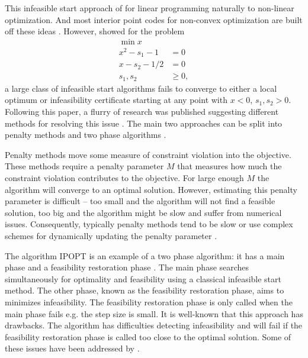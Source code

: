 \documentclass{article}
\begin{document}
This infeasible start approach of \cite{lustig1990feasibility} for linear programming naturally to non-linear optimization. 
And most interior point codes for non-convex optimization are built off these ideas \cite{vanderbei1999loqo,wachter2006implementation,byrd2006knitro}. However, \cite{wachter2000failure} showed for the problem
\begin{subequations}\label{failure-ex}
\begin{flalign}
\min { x }\\
x^2 - s_1 - 1 &= 0 \\
x - s_2 - 1/2 &= 0 \\
s_1, s_2 &\ge 0,
\end{flalign}
\end{subequations}
a large class of infeasible start algorithms fails to converge to either a local optimum or infeasibility certificate starting at any point with $x < 0$, $s_{1}, s_{2} > 0$. Following this paper, a flurry of research was published suggesting different methods for resolving this issue \cite{benson2004interior}. The main two approaches can be split into penalty methods \cite{liu2004robust, chen2006interior,curtis2012penalty,gould2015interior} and two phase algorithms \cite{wachter2006implementation}. 

Penalty methods move some measure of constraint violation into the objective. These methods require a penalty parameter $M$ that measures how much the constraint violation contributes to the objective. For large enough $M$ the algorithm will converge to an optimal solution. However, estimating this penalty parameter is difficult -- too small and the algorithm will not find a feasible solution, too big and the algorithm might be slow and suffer from numerical issues. Consequently, typically penalty methods tend to be slow \cite[Algorithm 1]{curtis2012penalty} or use complex schemes for dynamically updating the penalty parameter \cite[Algorithm 2]{curtis2012penalty}. 

The algorithm IPOPT is an example of a two phase algorithm: it has a main phase and a feasibility restoration phase  \cite{wachter2006implementation}. The main phase searches simultaneously for optimality and feasibility using a classical infeasible start method. The other phase, known as the feasibility restoration phase, aims to minimizes infeasibility. The feasibility restoration phase is only called when the main phase fails e.g. the step size is small. It is well-known that this approach has drawbacks. The algorithm has difficulties detecting infeasibility \cite[Table 15]{huang2016solution} and will fail if the feasibility restoration phase is called too close to the optimal solution. Some of these issues have been addressed by \cite{nocedal2014interior}. 
\end{document}

